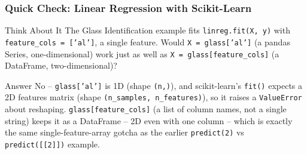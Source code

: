 \begin{frame}[fragile]\frametitle{Quick Check: Linear Regression with Scikit-Learn}
\begin{block}{Think About It}
The Glass Identification example fits \texttt{linreg.fit(X, y)} with \texttt{feature\_cols = ['al']}, a single feature. Would \texttt{X = glass['al']} (a pandas Series, one-dimensional) work just as well as \texttt{X = glass[feature\_cols]} (a DataFrame, two-dimensional)?
\end{block}
\pause
\begin{block}{Answer}
No -- \texttt{glass['al']} is 1D (shape \texttt{(n,)}), and scikit-learn's \texttt{fit()} expects a 2D features matrix (shape \texttt{(n\_samples, n\_features)}), so it raises a \texttt{ValueError} about reshaping. \texttt{glass[feature\_cols]} (a list of column names, not a single string) keeps it as a DataFrame -- 2D even with one column -- which is exactly the same single-feature-array gotcha as the earlier \texttt{predict(2)} vs \texttt{predict([[2]])} example.
\end{block}
\end{frame}

